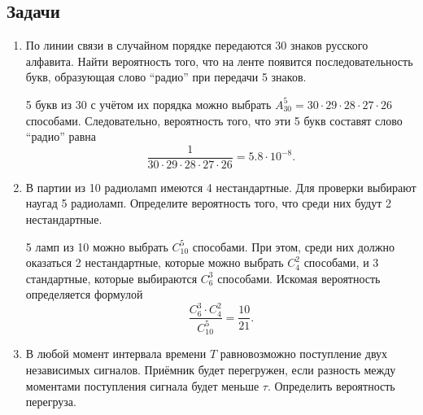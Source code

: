 \subsection{Задачи}
\begin{enumerate}
    \item По линии связи в случайном порядке передаются 30 знаков русского
        алфавита. Найти вероятность того, что на ленте появится
        последовательность букв, образующая слово ``радио'' при передачи 5
        знаков.

        5 букв из 30 с учётом их порядка можно выбрать
        \( A_{30}^{5} = 30\cdot29\cdot28\cdot27\cdot26 \) способами.
        Следовательно, вероятность того, что эти 5 букв составят слово ``радио''
        равна
        \[
            \frac{1}{30\cdot29\cdot28\cdot27\cdot26} = 5.8\cdot10^{-8}.
        \]
    \item В партии из 10 радиоламп имеются 4 нестандартные. Для проверки
        выбирают наугад 5 радиоламп. Определите вероятность того, что среди них
        будут 2 нестандартные.

        5 ламп из 10 можно выбрать \( C_{10}^5 \) способами. При этом, среди них
        должно оказаться 2 нестандартные, которые можно выбрать \( C_4^2 \)
        способами, и 3 стандартные, которые выбираются \( C_6^3 \) способами.
        Искомая вероятность определяется формулой
        \[
            \frac{C_6^3 \cdot C_4^2}{C_{10}^5} = \frac{10}{21}.
        \]
    \item В любой момент интервала времени \( T \) равновозможно поступление
        двух независимых сигналов. Приёмник будет перегружен, если разность
        между моментами поступления сигнала будет меньше \( \tau \). Определить
        вероятность перегруза.
        \begin{figure}[h]
        \begin{center}
        \end{center}
        \end{figure}


\end{enumerate}
